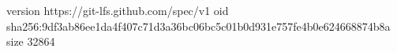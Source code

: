 version https://git-lfs.github.com/spec/v1
oid sha256:9df3ab86ee1da4f407c71d3a36bc06bc5c01b0d931e757fe4b0e624668874b8a
size 32864
